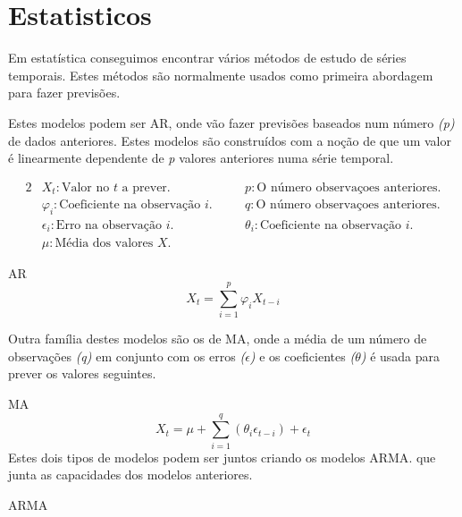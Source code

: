 \section{Estatisticos}

Em estatística conseguimos encontrar vários métodos de estudo de séries temporais. Estes métodos são normalmente usados como primeira abordagem para fazer previsões.\par
Estes modelos podem ser \gls{AR}, onde vão fazer previsões baseados num número \textit{(p)} de dados anteriores. Estes modelos são construídos com a noção de que um valor é linearmente dependente de \textit{p} valores anteriores numa série temporal.\par

\begin{alignat*}{2} 
    & X_{t} : \text{Valor no } t \text{ a prever.} &\quad& p : \text{O número observaçoes anteriores.} \\
    & \varphi_{i} : \text{Coeficiente na observação } i. &\quad& q : \text{O número observaçoes anteriores.} \\
    & \epsilon_{i} : \text{Erro na observação } i. &\quad& \theta_{i} : \text{Coeficiente na observação } i \text{.} \\ 
    & \mu : \text{Média dos valores } X \text{.} 
\end{alignat*}

\bigskip
\gls{AR} \\

\begin{equation} \label{eq:ar} 
    X_{t} = \sum_{i=1}^{p}\varphi_{i} X_{t-i} 
\end{equation}
\smallskip

Outra família destes modelos são os de \gls{MA}, onde a média de um número de observações \textit{(q)} em conjunto com os erros \textit{($\epsilon$)} e os coeficientes \textit{($\theta$)} é usada para prever os valores seguintes.\par
\bigskip
\gls{MA} \\

\begin{equation} \label{eq:ma} 
    X_{t} = \mu + \sum_{i=1}^{q}(\theta_{i} \epsilon_{t-i}) + \epsilon_{t}
\end{equation}
\smallskip
Estes dois tipos de modelos podem ser juntos criando os modelos \gls{ARMA}. que junta as capacidades dos modelos anteriores.\par

\bigskip
\gls{ARMA} \\

